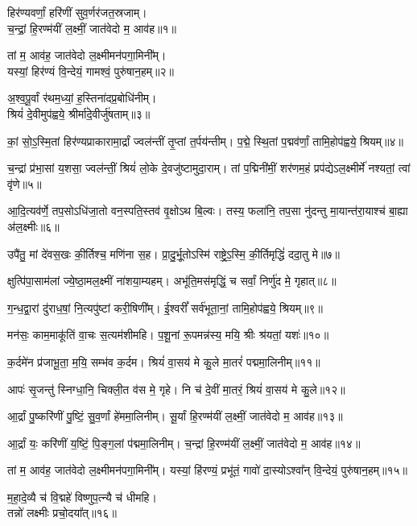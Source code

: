 

{\centering
हिर॑ण्यवर्णां॒ हरि॑णीं सुव॒र्णर॑जत॒स्रजाम्।\\
च॒न्द्रां॒ हि॒रण्म॑यीं ल॒क्ष्मीं॒ जात॑वेदो म॒ आव॑ह॥१॥

तां म॒ आव॑ह॒ जात॑वेदो ल॒क्ष्मीमन॑पगा॒मिनी᳚म्।\\
यस्यां॒ हिर॑ण्यं वि॒न्देयं॒ गामश्वं॒ पुरु॑षान॒हम्॥२॥

अ॒श्व॒पू॒र्वां र॑थम॒ध्यां॒ ह॒स्तिना॑दप्र॒बोधि॑नीम्।\\
श्रियं॑ दे॒वीमुप॑ह्वये॒ श्रीर्मा॑दे॒वीर्जु॑षताम्॥३॥

}

कां॒ सो॒ऽ॒स्मि॒तां हिर॑ण्यप्राकारामा॒र्द्रां ज्वल॑न्तीं तृ॒प्तां त॒र्पय॑न्तीम्।
प॒द्मे॒ स्थि॒तां प॒द्मव॑र्णां॒ तामि॒होप॑ह्वये॒ श्रियम्॥४॥

च॒न्द्रां प्र॑भा॒सां य॒शसा॒ ज्वल॑न्तीं॒ श्रियं॑ लो॒के दे॒वजु॑ष्टामुदा॒राम्।
तां प॒द्मिनी॑मीं॒ शर॑णम॒हं प्रप॑द्येऽल॒क्ष्मीर्मे॑ नश्यतां॒ त्वां वृ॑णे॥५॥

आ॒दि॒त्यव॑र्णे॒ तप॒सोऽधि॑जा॒तो वन॒स्पति॒स्तव॑ वृ॒क्षोऽथ बि॒ल्वः।
तस्य॒ फला॑नि॒ तप॒सा नु॑दन्तु मा॒यान्त॑रा॒याश्च॑ बा॒ह्या अ॑ल॒क्ष्मीः॥६॥

उपै॑तु॒ मां दे॑वस॒खः की॒र्तिश्च॒ मणि॑ना स॒ह।
प्रा॒दु॒र्भू॒तोऽस्मि॑ राष्ट्रे॒ऽ॒स्मि॒\an{} की॒र्तिमृद्धिं॑ ददा॒तु मे॥७॥

क्षुत्पि॑पा॒साम॑लां ज्ये॒ष्ठा॒मल॒क्ष्मीं ना॑शया॒म्यहम्।
अभू॑ति॒\-मस॑मृद्धिं॒ च सर्वां॒ निर्णु॑द मे॒ गृहात्॥८॥

ग॒न्ध॒द्वा॒रां दु॑राध॒\ar{}षां॒ नि॒त्यपु॑ष्टां करी॒षिणी᳚म्।
ई॒श्वरीं᳚ सर्व॑भूता॒नां॒ तामि॒होप॑ह्वये॒ श्रियम्॥९॥

मन॑सः॒ काम॒माकू॑तिं वा॒चः स॒त्यम॑शीमहि।
प॒शू॒नां रू॒पमन्न॑स्य॒ मयि॒ श्रीः श्र॑यतां॒ यशः॑॥१०॥

क॒र्दमे॑न प्र॑जाभू॒ता॒ म॒यि॒ सम्भ॑व क॒र्दम।
श्रियं॑ वा॒सय॑ मे कु॒ले मा॒तरं॑ पद्ममा॒लिनीम्॥११॥

आपः॑ सृ॒जन्तु॑ स्निग्धा॒नि॒ चिक्ली॒त व॑स मे॒ गृहे।
नि च॑ दे॒वीं मा॒तरं॒ श्रियं॑ वा॒सय॑ मे कु॒ले॥१२॥

आ॒र्द्रां पु॒ष्करि॑णीं पु॒ष्टिं॒ सु॒व॒र्णां हे॑ममा॒लिनीम्।
सू॒र्यां हि॒रण्म॑यीं ल॒क्ष्मीं॒ जात॑वेदो म॒ आव॑ह॥१३॥

आ॒र्द्रां यः॒ करि॑णीं य॒ष्टिं॒ पि॒ङ्ग॒लां प॑द्ममा॒लिनीम्।
च॒न्द्रां हि॒रण्म॑यीं ल॒क्ष्मीं॒ जात॑वेदो म॒ आव॑ह॥१४॥

तां म॒ आव॑ह॒ जात॑वेदो ल॒क्ष्मीमन॑पगा॒मिनी᳚म्।
यस्यां॒ हि॑रण्यं॒ प्रभू॑तं॒ गावो॑ दा॒स्योऽश्वा᳚न् वि॒न्देयं॒ पुरु॑षान॒हम्॥१५॥

\begin{center}
{म॒हा॒दे॒व्यै च॑ वि॒द्महे॑ विष्णुप॒त्न्यै च॑ धीमहि।\\
तन्नो॑ लक्ष्मीः प्रचो॒दया᳚त्॥१६॥}
\end{center}
